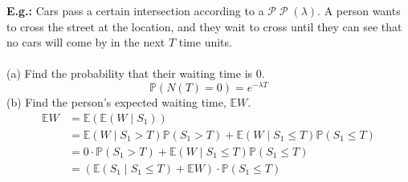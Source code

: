 \documentclass[a4paper]{article}
\newcommand{\n}{\hfill\break}
\newcommand{\eg}[1]{\par\noindent\settowidth{\hangindent}{\textbf{E.g.: }}\textbf{E.g.: }#1\n}
\newcommand{\Prob}{\mathbb{P}}
\renewcommand{\P}{\Prob}
\newcommand{\Avg}{\mathbb{E}}
\newcommand{\E}{\Avg}
\DeclareMathOperator{\Poiss}{\mathcal{P}}
\begin{document}
\eg{
Cars pass a certain intersection according to a $\mathcal{P}\Poiss(\lambda)$. A person wants to cross the street at the location, and they wait to cross until they can see that no cars will come by in the next $T$ time units. %
\\\\
(a) Find the probability that their waiting time is 0.
\[\P(N(T)=0)=e^{-\lambda T}\]
(b) Find the person's expected waiting time, $\E W$.
\begin{align*}
    \E W&=\E(\E(W\mid S_1)) \\
    &=\E(W\mid S_1>T)\P(S_1>T)+\E(W\mid S_1\leq T)\P(S_1\leq T) \\
    &=0\cdot\P(S_1>T)+\E(W\mid S_1\leq T)\P(S_1\leq T) \\
    &=(\E(S_1\mid S_1\leq T)+\E W)\cdot\P(S_1\leq T)
\end{align*}
}
\end{document}
